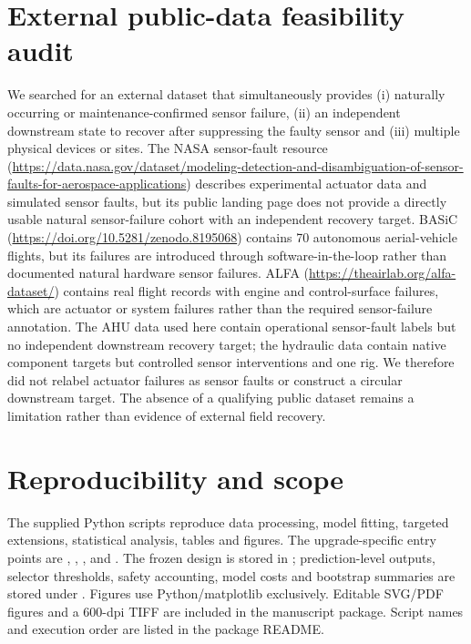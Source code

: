 \documentclass[10pt]{article}
\begin{document}
\section{External public-data feasibility audit}

We searched for an external dataset that simultaneously provides (i) naturally occurring or maintenance-confirmed sensor failure, (ii) an independent downstream state to recover after suppressing the faulty sensor and (iii) multiple physical devices or sites. The NASA sensor-fault resource (\url{https://data.nasa.gov/dataset/modeling-detection-and-disambiguation-of-sensor-faults-for-aerospace-applications}) describes experimental actuator data and simulated sensor faults, but its public landing page does not provide a directly usable natural sensor-failure cohort with an independent recovery target. BASiC (\url{https://doi.org/10.5281/zenodo.8195068}) contains 70 autonomous aerial-vehicle flights, but its failures are introduced through software-in-the-loop rather than documented natural hardware sensor failures. ALFA (\url{https://theairlab.org/alfa-dataset/}) contains real flight records with engine and control-surface failures, which are actuator or system failures rather than the required sensor-failure annotation. The AHU data used here contain operational sensor-fault labels but no independent downstream recovery target; the hydraulic data contain native component targets but controlled sensor interventions and one rig. We therefore did not relabel actuator failures as sensor faults or construct a circular downstream target. The absence of a qualifying public dataset remains a limitation rather than evidence of external field recovery.

\section{Reproducibility and scope}

The supplied Python scripts reproduce data processing, model fitting, targeted extensions, statistical analysis, tables and figures. The upgrade-specific entry points are , , ,  and . The frozen design is stored in ; prediction-level outputs, selector thresholds, safety accounting, model costs and bootstrap summaries are stored under . Figures use Python/matplotlib exclusively. Editable SVG/PDF figures and a 600-dpi TIFF are included in the manuscript package. Script names and execution order are listed in the package README.
\end{document}
